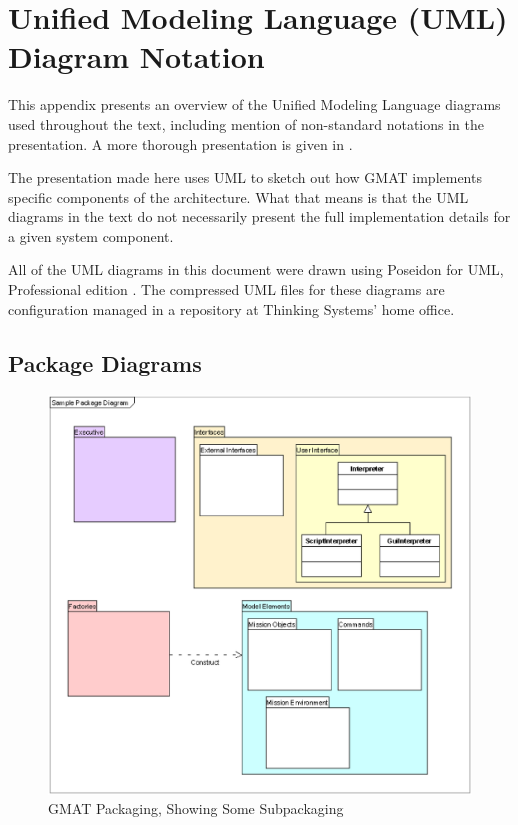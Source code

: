 \chapter{\label{chapter:UMLDiagrams}Unified Modeling Language (UML) Diagram Notation}

This appendix presents an overview of the Unified Modeling Language diagrams used throughout the
text, including mention of non-standard notations in the presentation.  A more thorough presentation
is given in \cite{fowler}.

The presentation made here uses UML to sketch out how GMAT implements specific components of the
architecture.  What that means is that the UML diagrams in the text do not necessarily present the
full implementation details for a given system component.

All of the UML diagrams in this document were drawn using Poseidon for UML, Professional edition
\cite{poseidon}.  The compressed UML files for these diagrams are configuration managed in a
repository at Thinking Systems' home office.

\section{Package Diagrams}

\begin{figure}[htb]
\begin{center}
\includegraphics[scale=0.5]{Images/UmlPackageSample.eps}
\caption{\label{figure:UmlPackageExample}GMAT Packaging, Showing Some Subpackaging}
\end{center}
\end{figure}

